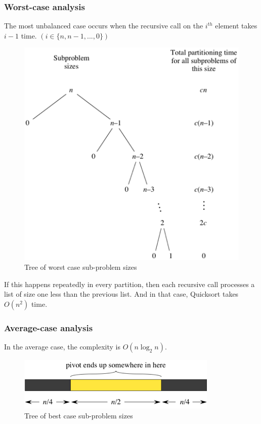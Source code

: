 \documentclass[a4paper]{article}
\begin{document}
\subsubsection{Worst-case analysis}
The most unbalanced case occurs when the recursive call on the $i^{th}$ element takes $i-1$ time. $(i\in\{n,n-1,...,0\})$
\begin{center}
    \begin{figure}[H]
    \begin{center}
     \includegraphics[scale=1.2]{Quick_worst}
    \end{center}
    \caption{Tree of worst case sub-problem sizes}
    \label{refhinh1}
    \end{figure}
\end{center}
If this happens repeatedly in every partition, then each recursive call processes a list of size one less than the previous list. And in that case, Quicksort takes $O(n^2)$ time.
\subsubsection{Average-case analysis}
In the average case, the complexity is $O(n\log_2{n})$.
\begin{center}
    \begin{figure}[H]
    \begin{center}
     \includegraphics[scale=1.2]{Quick_ave}
    \end{center}
    \caption{Tree of best case sub-problem sizes}
    \label{ref0}
    \end{figure}
\end{center}
\end{document}
